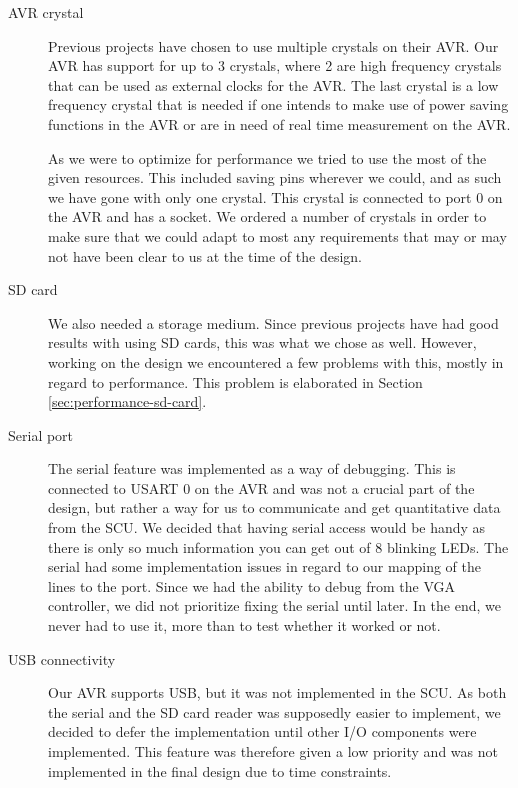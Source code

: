 \begin{description}

\item[AVR crystal] \hfill

Previous projects have chosen to use multiple crystals on their AVR. Our AVR has support for up to 3 crystals, where 2 are high frequency crystals that can be used as external clocks for the AVR. The last crystal is a low frequency crystal that is needed if one intends to make use of power saving functions in the AVR or are in need of real time measurement on the AVR. 

As we were to optimize for performance we tried to use the most of the given resources. This included saving pins wherever we could, and as such we have gone with only one crystal. This crystal is connected to port 0 on the AVR and has a socket. We ordered a number of crystals in order to make sure that we could adapt to most any requirements that may or may not have been clear to us at the time of the design.

\item[SD card]  \hfill %

We also needed a storage medium. Since previous projects have had good results with
using \ac{SD} cards, this was what we chose as well. However, working on the
design we encountered a few problems with this, mostly in
regard to performance. This problem is elaborated in Section
\ref{sec:performance-sd-card}.

\item[Serial port]  \hfill

The serial feature was implemented as a way of debugging. This is connected to
\ac{USART} 0 on the AVR and was not a crucial part of the design, but rather a
way for us to communicate and get quantitative data from the \ac{SCU}. We
decided that having serial access would be handy as there is only so much
information you can get out of 8 blinking \acp{LED}. The serial had some
implementation issues in regard to our mapping of the lines to the port. Since
we had the ability to debug from the \ac{VGA} controller, we did not prioritize
fixing the serial until later. In the end, we never had to use it, more than to
test whether it worked or not.

\item[USB connectivity]  \hfill 

Our AVR supports \ac{USB}, but it was not implemented in the \ac{SCU}. As both
the serial and the \ac{SD} card reader was supposedly easier to
implement\cite{berg2011festinalente}, we decided to defer the implementation
until other \ac{I/O} components were implemented. This feature was therefore
given a low priority and was not implemented in the final design due to time
constraints.
 

\end{description}
